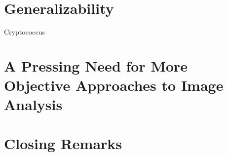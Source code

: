 \section{Generalizability}

Cryptococcus

\citep{Bojarczuk2016, Lin2006b}

\section{A Pressing Need for More Objective Approaches to Image Analysis}

\citep{Heath2017}


\section{Closing Remarks}
